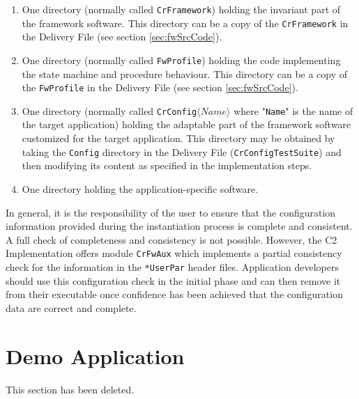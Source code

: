 \documentclass{pnp_article}
\begin{document}
\begin{enumerate}
\item One directory (normally called \texttt{CrFramework}) holding the invariant part of the framework software. This directory can be a copy of the \texttt{CrFramework} in the Delivery File (see section \ref{sec:fwSrcCode}).
\item One directory (normally called \texttt{FwProfile}) holding the code implementing the state machine and procedure behaviour. This directory can be a copy of the \texttt{FwProfile} in the Delivery File (see section \ref{sec:fwSrcCode}).
\item One directory (normally called \texttt{CrConfig$\langle Name \rangle$} where "\texttt{Name}" is the name of the target application) holding the adaptable part of the framework software customized for the target application. This directory may be obtained by taking the \texttt{Config} directory in the Delivery File (\texttt{CrConfigTestSuite}) and then modifying its content as specified in the implementation steps.
\item One directory holding the application-specific software.
\end{enumerate}

In general, it is the responsibility of the user to ensure that the configuration information provided during the instantiation process is complete and consistent. A full check of completeness and consistency is not possible. However, the C2 Implementation offers module \texttt{CrFwAux} which implements a partial consistency check for the information in the \texttt{*UserPar} header files. Application developers should use this configuration check in the initial phase and can then remove it from their executable once confidence has been achieved that the configuration data are correct and complete.


\begin{landscape}


\end{landscape}


\section{Demo Application}\label{sec:DemoApp}
This section has been deleted.
\end{document}
